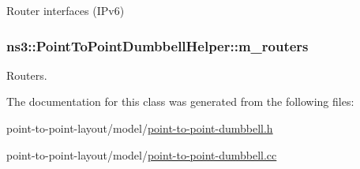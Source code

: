 Router interfaces (I\+Pv6) 

\subsubsection[{\texorpdfstring{m\+\_\+routers}{m_routers}}]{ ns3\+::\+Point\+To\+Point\+Dumbbell\+Helper\+::m\+\_\+routers\hspace{0.3cm}{\ttfamily [private]}}\hypertarget{classns3_1_1PointToPointDumbbellHelper_a6fcec768335fc9e33779a551c1141bc4}{}\label{classns3_1_1PointToPointDumbbellHelper_a6fcec768335fc9e33779a551c1141bc4}


Routers. 



The documentation for this class was generated from the following files\+:\begin{DoxyCompactItemize}
\item 
point-\/to-\/point-\/layout/model/\hyperlink{point-to-point-dumbbell_8h}{point-\/to-\/point-\/dumbbell.\+h}\item 
point-\/to-\/point-\/layout/model/\hyperlink{point-to-point-dumbbell_8cc}{point-\/to-\/point-\/dumbbell.\+cc}\end{DoxyCompactItemize}
